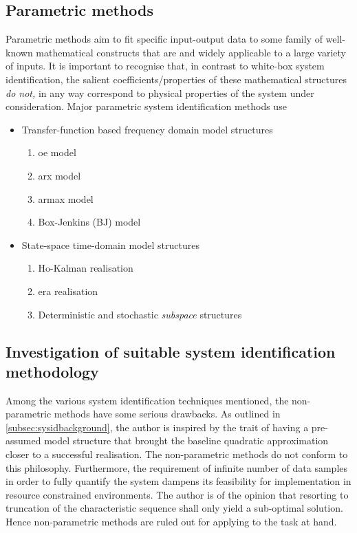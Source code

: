 \subsection{Parametric methods}\label{subsec:parametric}
Parametric  methods aim  to fit  specific input-output  data to  some family  of
well-known mathematical  constructs that  are and widely  applicable to  a large
variety of inputs.  It is important to recognise that,  in contrast to white-box
system identification, the salient coefficients/properties of these mathematical
structures \emph{do  not,} in any way  correspond to physical properties  of the
system under consideration. Major parametric system identification methods use
\begin{itemize}[topsep=-5pt,itemsep=-1pt,partopsep=-5pt, parsep=-1pt]
    \item Transfer-function based frequency domain model structures
        \begin{enumerate}[topsep=1.25pt,itemsep=1.25pt,partopsep=1.25pt, parsep=1.25pt]
            \item \gls{oe} model
            \item \gls{arx} model
            \item \gls{armax} model
            \item Box-Jenkins (BJ) model
        \end{enumerate}
    \item State-space time-domain model structures
        \begin{enumerate}[topsep=1.25pt,itemsep=1.25pt,partopsep=1.25pt, parsep=1.25pt]
            \item Ho-Kalman realisation
            \item \gls{era} realisation
            \item Deterministic and stochastic \emph{subspace} structures
        \end{enumerate}
\end{itemize}

\subsection{Investigation of suitable system identification methodology}\label{subsec:suitablesysid}
Among   the   various   system    identification   techniques   mentioned,   the
non-parametric   methods    have   some    serious   drawbacks.    As   outlined
in \cref{subsec:sysidbackground}, the author is inspired  by the trait of having
a pre-assumed model structure that  brought the baseline quadratic approximation
closer to a successful realisation. The non-parametric methods do not conform to
this philosophy. Furthermore, the requirement of infinite number of data samples
in order to fully quantify the system dampens its feasibility for implementation
in  resource  constrained  environments.  The  author is  of  the  opinion  that
resorting  to truncation  of  the  characteristic sequence  shall  only yield  a
sub-optimal solution. Hence non-parametric methods are ruled out for applying to
the task at hand.

